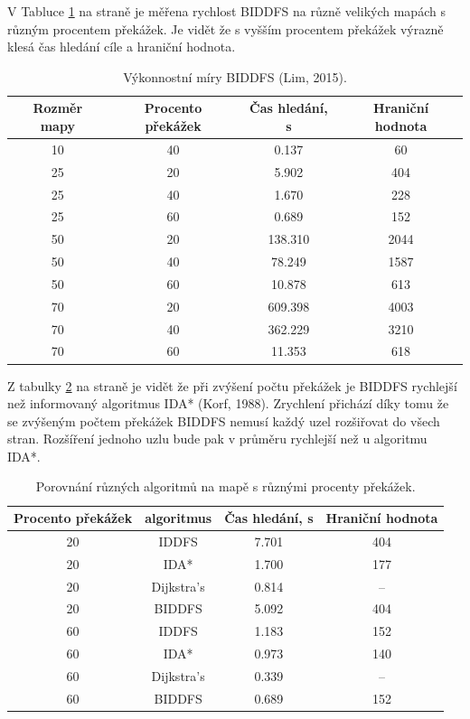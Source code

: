 \documentclass[12pt]{report}
\begin{document}
	V Tabluce \ref{tab:biddfs} na straně \pageref{tab:biddfs} je měřena rychlost BIDDFS na různě velikých mapách s různým procentem překážek. Je vidět že s vyšším procentem překážek výrazně klesá čas hledání cíle a hraniční hodnota.

\begin{table}[h]
	\centering
	\begin{tabular}{c|c|c|c}
		\hline
		Rozměr mapy & Procento překážek & Čas hledání, s & Hraniční hodnota \\
		\hline
		10 & 40 & 0.137 & 60 \\
		25 & 20 & 5.902 & 404 \\
		25 & 40 & 1.670 & 228 \\
		25 & 60 & 0.689 & 152 \\
		50 & 20 & 138.310 & 2044 \\
		50 & 40 & 78.249 & 1587 \\
		50 & 60 & 10.878 & 613 \\
		70 & 20 & 609.398 & 4003 \\
		70 & 40 & 362.229 & 3210 \\
		70 & 60 & 11.353 & 618 \\
		\hline
	\end{tabular}
	\caption{Výkonnostní míry BIDDFS (Lim, 2015).}
	\label{tab:biddfs}
\end{table}

Z tabulky \ref{tab:biddfsvs} na straně \pageref{tab:biddfsvs} je vidět že při zvýšení počtu překážek je BIDDFS rychlejší než informovaný algoritmus IDA* (Korf, 1988). Zrychlení přichází díky tomu že se zvýšeným počtem překážek BIDDFS nemusí každý uzel rozšiřovat do všech stran. Rozšíření jednoho uzlu bude pak v průměru rychlejší než u algoritmu IDA*.

\begin{table}[h]
	\centering
	\begin{tabular}{c|c|c|c}
		\hline
		Procento překážek & algoritmus & Čas hledání, s & Hraniční hodnota \\
		\hline
		20 & IDDFS & 7.701 & 404 \\
		20 & IDA* & 1.700 & 177 \\
		20 & Dijkstra’s & 0.814 & -- \\
		20 & BIDDFS & 5.092 & 404 \\
		\hline
		60 & IDDFS & 1.183 & 152 \\
		60 & IDA* & 0.973 & 140 \\
		60 & Dijkstra’s & 0.339 & -- \\
		60 & BIDDFS & 0.689 & 152 \\
		\hline
	\end{tabular}
	\caption{Porovnání různých algoritmů na mapě s různými procenty překážek.}
	\label{tab:biddfsvs}
\end{table}
	
\end{document}
